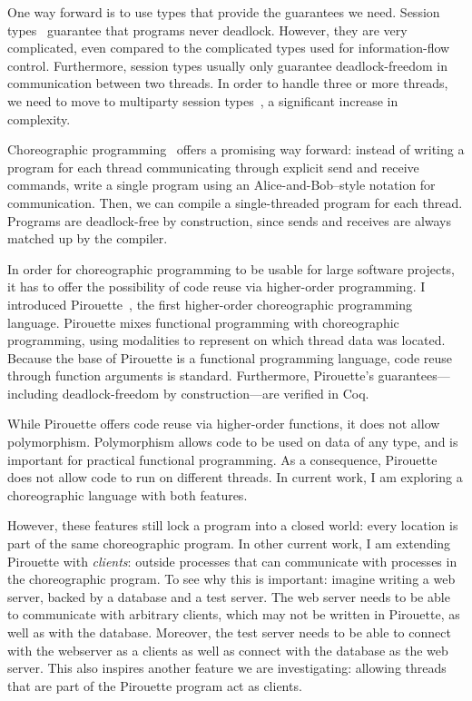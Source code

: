 \documentclass{article}
\theoremstyle{definition}
\begin{document}
One way forward is to use types that provide the guarantees we need.
Session types~\citep{DeYoungCPT09,Wadler12} guarantee that programs never deadlock.
However, they are very complicated, even compared to the complicated types used for information-flow control.
Furthermore, session types usually only guarantee deadlock-freedom in communication between two threads.
In order to handle three or more threads, we need to move to multiparty session types~\cite{ScalasY19,HondaYC16}, a significant increase in complexity.

Choreographic programming~\citep{Montesi13} offers a promising way forward: instead of writing a program for each thread communicating through explicit send and receive commands, write a single program using an Alice-and-Bob--style notation for communication.
Then, we can compile a single-threaded program for each thread.
Programs are deadlock-free by construction, since sends and receives are always matched up by the compiler.

In order for choreographic programming to be usable for large software projects, it has to offer the possibility of code reuse via higher-order programming.
I introduced Pirouette~\citep{HirschG22}, the first higher-order choreographic programming language.
Pirouette mixes functional programming with choreographic programming, using modalities to represent on which thread data was located.
Because the base of Pirouette is a functional programming language, code reuse through function arguments is standard.
Furthermore, Pirouette's guarantees---including deadlock-freedom by construction---are verified in Coq.

While Pirouette offers code reuse via higher-order functions, it does not allow polymorphism.
Polymorphism allows code to be used on data of any type, and is important for practical functional programming.
As a consequence, Pirouette does not allow code to run on different threads.
In current work, I am exploring a choreographic language with both features.

However, these features still lock a program into a closed world: every location is part of the same choreographic program.
In other current work, I am extending Pirouette with \emph{clients}: outside processes that can communicate with processes in the choreographic program.
To see why this is important: imagine writing a web server, backed by a database and a test server.
The web server needs to be able to communicate with arbitrary clients, which may not be written in Pirouette, as well as with the database.
Moreover, the test server needs to be able to connect with the webserver as a clients as well as connect with the database as the web server.
This also inspires another feature we are investigating: allowing threads that are part of the Pirouette program act as clients.
\end{document}
